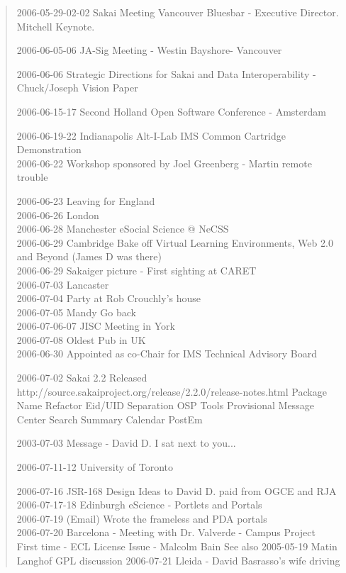\begin{quote}
2006-05-29-02-02 Sakai Meeting Vancouver Bluesbar - Executive Director.  Mitchell Keynote.

2006-06-05-06 JA-Sig Meeting - Westin Bayshore- Vancouver

2006-06-06 Strategic Directions for Sakai and Data Interoperability - Chuck/Joseph Vision Paper 

2006-06-15-17 Second Holland Open Software Conference  - Amsterdam

2006-06-19-22 Indianapolis Alt-I-Lab IMS Common Cartridge Demonstration\\
2006-06-22 Workshop sponsored by Joel Greenberg - Martin remote trouble

2006-06-23 Leaving for England\\
2006-06-26 London\\
2006-06-28 Manchester eSocial Science @ NeCSS\\
2006-06-29 Cambridge Bake off Virtual Learning Environments, 
           Web 2.0 and Beyond (James D was there)\\
2006-06-29 Sakaiger picture - First sighting at CARET\\
2006-07-03 Lancaster\\
2006-07-04 Party at Rob Crouchly's house\\
2006-07-05 Mandy Go back\\
2006-07-06-07 JISC Meeting in York\\
2006-07-08 Oldest Pub in UK\\

2006-06-30 Appointed as co-Chair for IMS Technical Advisory Board

2006-07-02 Sakai 2.2 Released
http://source.sakaiproject.org/release/2.2.0/release-notes.html
Package Name Refactor
Eid/UID Separation
OSP Tools Provisional
Message Center
Search
Summary Calendar
PostEm

2003-07-03 Message - David D. I sat next to you...

2006-07-11-12 University of Toronto

2006-07-16 JSR-168 Design Ideas to David D. paid from OGCE and RJA\\

2006-07-17-18 Edinburgh eScience - Portlets and Portals\\
2006-07-19 (Email) Wrote the frameless and PDA portals\\
2006-07-20 Barcelona - Meeting with Dr. Valverde - Campus Project\\
   First time  - ECL License Issue - Malcolm Bain
   See also 2005-05-19 Matin Langhof GPL discussion
2006-07-21 Lleida - David Basrasso's wife driving\\


\end{quote}
